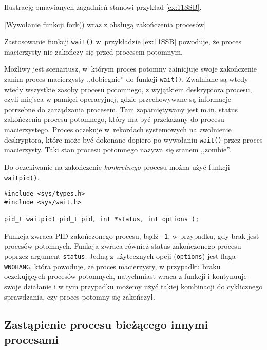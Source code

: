 Ilustrację omawianych zagadnień stanowi przykład \ref{ex:11SSB}.
\begin{example}{[Wywołanie funkcji fork() wraz z obsługą zakończenia procesów]}
  \label{ex:11SSB}
  
  Zastosowanie funkcji \texttt{wait()} w~przykładzie \ref{ex:11SSB} powoduje,
  że proces macierzysty nie zakończy się przed procesem potomnym.
\end{example}

Możliwy jest scenariusz, w~którym proces potomny zainicjuje swoje zakończenie
zanim proces macierzysty ,,dobiegnie'' do funkcji \texttt{wait()}. Zwalniane są
wtedy wtedy wszystkie zasoby procesu potomnego, z wyjątkiem deskryptora
procesu, czyli miejsca w pamięci operacyjnej, gdzie przechowywane są informacje
potrzebne do zarządzania procesem. Tam zapamiętywany jest m.in. status
zakończenia procesu potomnego, który ma być przekazany do procesu
macierzystego. Proces oczekuje w~rekordach systemowych na zwolnienie
deskryptora, które może być dokonane dopiero po wywołaniu \texttt{wait()} przez
proces macierzysty. Taki stan procesu potomnego nazywa się stanem ,,zombie''.

Do oczekiwanie na zakończenie \textit{konkretnego} procesu można użyć funkcji
\texttt{waitpid()}.
\begin{lstlisting}[style=MyCStyle]
#include <sys/types.h>
#include <sys/wait.h>

pid_t waitpid( pid_t pid, int *status, int options );
\end{lstlisting}
Funkcja zwraca PID zakończonego procesu, bądź \texttt{-1}, w przypadku, gdy
brak jest procesów potomnych. Funkcja zwraca również status zakończonego
procesu poprzez argument \texttt{status}. Jedną z użytecznych opcji
(\texttt{options}) jest flaga \texttt{WNOHANG}, która powoduje, że proces
macierzysty, w przypadku braku oczekujących procesów potomnych, natychmiast
wraca z funkcji i kontynuuje swoje działanie i w tym przypadku możemy użyć
takiej kombinacji do cyklicznego sprawdzania, czy proces potomny się zakończył.


\subsection{Zastąpienie procesu bieżącego innymi procesami}


